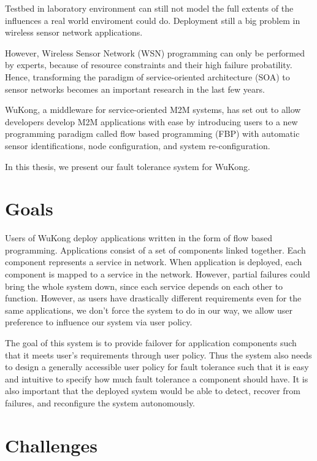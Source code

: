 Testbed in laboratory environment can still not model the full extents of the
influences a real world enviroment could do. Deployment still a big problem in
wireless sensor network applications.

However, Wireless Sensor Network (WSN) programming can only be performed by
experts, because of resource constraints and their high failure probatility.
Hence, transforming the paradigm of service-oriented architecture (SOA) to
sensor networks becomes an important research in the last few
years.~\cite{Koutsoukos2007,Hughes2012}

WuKong, a middleware for service-oriented M2M systems, has set out to allow
developers develop M2M applications with ease by introducing users to a new
programming paradigm called flow based programming (FBP) with automatic sensor
identifications, node configuration, and system re-configuration.~\cite{Reijers}

In this thesis, we present our fault tolerance system for WuKong.

\section{Goals} %

Users of WuKong deploy applications written in the form of flow based
programming. Applications consist of a set of components linked together.  Each
component represents a service in network. When application is deployed, each
component is mapped to a service in the network. However, partial failures could
bring the whole system down, since each service depends on each other to
function. However, as users have drastically different requirements even for the
same applications, we don't force the system to do in our way, we allow user
preference to influence our system via user policy. 

The goal of this system is to provide failover for application components such
that it meets user's requirements through user policy. Thus the system also
needs to design a generally accessible user policy for fault tolerance such that
it is easy and intuitive to specify how much fault tolerance a component should
have. It is also important that the deployed system would be able to detect,
  recover from failures, and reconfigure the system autonomously. 


\section{Challenges}

